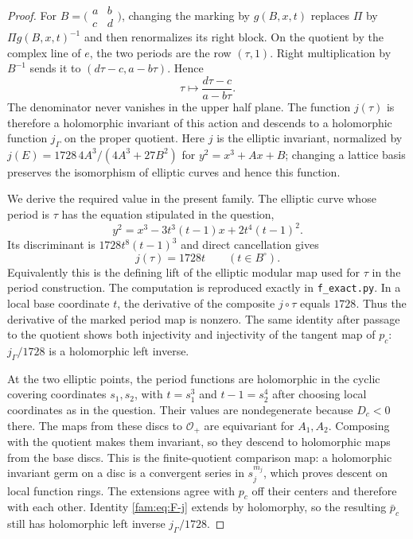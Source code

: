 \begin{proof}
For $B=\bigl(\begin{smallmatrix}a&b\\c&d\end{smallmatrix}\bigr)$, changing
the marking by $g(B,x,t)$ replaces $\Pi$ by $\Pi g(B,x,t)^{-1}$ and then
renormalizes its right block.  On the quotient by the complex line of
$e$, the two periods are the row $(\tau,1)$.  Right multiplication by
$B^{-1}$ sends it to $(d\tau-c,a-b\tau)$.  Hence
\begin{equation}\label{fam:eq:F-tauaction}
 \tau\longmapsto\frac{d\tau-c}{a-b\tau}.
\end{equation}
The denominator never vanishes in the upper half plane.  The function
$j(\tau)$ is therefore a holomorphic invariant of this action and
descends to a holomorphic function $j_\Gamma$ on the proper quotient.
Here $j$ is the elliptic invariant, normalized by
$j(E)=1728\,4A^3/(4A^3+27B^2)$ for $y^2=x^3+Ax+B$; changing a lattice
basis preserves the isomorphism of elliptic curves and hence this
function.

We derive the required value in the present family.  The elliptic curve
whose period is $\tau$ has the equation stipulated in the question,
\[
 y^2=x^3-3t^3(t-1)x+2t^4(t-1)^2.
\]
Its discriminant is $1728t^8(t-1)^3$ and direct cancellation gives
\begin{equation}\label{fam:eq:F-j}
 j(\tau)=1728t\qquad(t\in B^\circ).
\end{equation}
Equivalently this is the defining lift of the elliptic modular map used
for $\tau$ in the period construction.  The computation is reproduced
exactly in \texttt{f\_exact.py}.  In a local base coordinate $t$, the
derivative of the composite $j\circ\tau$ equals $1728$.  Thus the
derivative of the marked period map is nonzero.  The same identity after
passage to the quotient shows both injectivity and injectivity of the
tangent map of $p_c$: $j_\Gamma/1728$ is a holomorphic left inverse.

At the two elliptic points, the period functions are holomorphic in the
cyclic covering coordinates $s_1,s_2$, with $t=s_1^3$ and
$t-1=s_2^4$ after choosing local coordinates as in the question.  Their
values are nondegenerate because $D_c<0$ there.  The maps from these
discs to $\mathcal O_+$ are equivariant for $A_1,A_2$.  Composing with
the quotient makes them invariant, so they descend to holomorphic maps
from the base discs.  This is the finite-quotient comparison map: a
holomorphic invariant germ on a disc is a convergent series in $s_j^{m_j}$,
which proves descent on local function rings.  The extensions agree
with $p_c$ off their centers and therefore with each other.  Identity
\eqref{fam:eq:F-j} extends by holomorphy, so the resulting $\bar p_c$ still
has holomorphic left inverse $j_\Gamma/1728$.


\end{proof}
